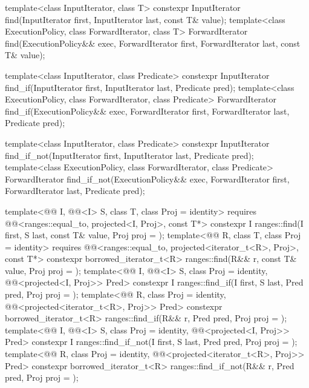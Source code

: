 %
%
%
\begin{itemdecl}
template<class InputIterator, class T>
  constexpr InputIterator find(InputIterator first, InputIterator last,
                               const T& value);
template<class ExecutionPolicy, class ForwardIterator, class T>
  ForwardIterator find(ExecutionPolicy&& exec, ForwardIterator first, ForwardIterator last,
                       const T& value);

template<class InputIterator, class Predicate>
  constexpr InputIterator find_if(InputIterator first, InputIterator last,
                                  Predicate pred);
template<class ExecutionPolicy, class ForwardIterator, class Predicate>
  ForwardIterator find_if(ExecutionPolicy&& exec, ForwardIterator first, ForwardIterator last,
                          Predicate pred);

template<class InputIterator, class Predicate>
  constexpr InputIterator find_if_not(InputIterator first, InputIterator last,
                                      Predicate pred);
template<class ExecutionPolicy, class ForwardIterator, class Predicate>
  ForwardIterator find_if_not(ExecutionPolicy&& exec,
                              ForwardIterator first, ForwardIterator last,
                              Predicate pred);

template<@@ I, @@<I> S, class T, class Proj = identity>
  requires @@<ranges::equal_to, projected<I, Proj>, const T*>
  constexpr I ranges::find(I first, S last, const T& value, Proj proj = {});
template<@@ R, class T, class Proj = identity>
  requires @@<ranges::equal_to, projected<iterator_t<R>, Proj>, const T*>
  constexpr borrowed_iterator_t<R>
    ranges::find(R&& r, const T& value, Proj proj = {});
template<@@ I, @@<I> S, class Proj = identity,
         @@<projected<I, Proj>> Pred>
  constexpr I ranges::find_if(I first, S last, Pred pred, Proj proj = {});
template<@@ R, class Proj = identity,
         @@<projected<iterator_t<R>, Proj>> Pred>
  constexpr borrowed_iterator_t<R>
    ranges::find_if(R&& r, Pred pred, Proj proj = {});
template<@@ I, @@<I> S, class Proj = identity,
         @@<projected<I, Proj>> Pred>
  constexpr I ranges::find_if_not(I first, S last, Pred pred, Proj proj = {});
template<@@ R, class Proj = identity,
         @@<projected<iterator_t<R>, Proj>> Pred>
  constexpr borrowed_iterator_t<R>
    ranges::find_if_not(R&& r, Pred pred, Proj proj = {});
\end{itemdecl}

